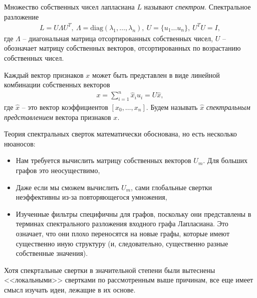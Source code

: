 \documentclass[%
	11pt,
	a4paper,
	utf8,
		]{article}
\begin{document}
Множество собственных чисел лапласиана $ L $ называют \emph{спектром}. Спектральное разложение
\begin{align*}
	L = U \Lambda U^T, \ \Lambda = \text{diag}(\lambda_1, \ldots, \lambda_n), \ U = \{u_1 \ldots u_n\}, \ U^T U = I,
\end{align*}
где $ \Lambda $ -- диагональная матрица отсортированных собственных чисел, $ U $ -- обозначает матрицу собственных векторов, отсортированных по возрастанию собственных чисел.

Каждый вектор признаков $ x $ может быть представлен в виде линейной комбинации собственных векторов
\begin{align*}
	x = \sum_{i=1}^n \hat{x}_i u_i = U \hat{x},
\end{align*}
где $ \hat{x} $ -- это вектор коэффициентов $ [x_0, \ldots, x_n] $. Будем называть $ \hat{x} $ \emph{спектральным представлением} вектора признаков $ x $.


Теория спектральных сверток математически обоснована, но есть несколько нюаносов:
\begin{itemize}
	\item Нам требуется вычислить матрицу собственных векторов $ U_m $. Для больших графов это неосуществимо,
	
	\item Даже если мы сможем вычислить $ U_m $, сами глобальные свертки неэффективны из-за повторяющегося умножения,
	
	\item Изученные фильтры специфичны для графов, поскольку они представлены в терминах спектрального разложения входного графа Лапласиана. Это означает, что они плохо переносятся на новые графы, которые имеют существенно иную структуру (и, следовательно, существенно разные собственные значения).
\end{itemize}

Хотя спекртальные свертки в значительной степени были вытеснены <<локальными>> свертками по рассмотренным выше причинам, все еще имеет смысл изучать идеи, лежащие в их основе.
\end{document}
